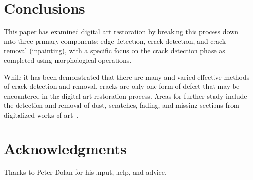 \documentclass{sig-alternate}
\begin{document}
\section{Conclusions}\label{conclusion}
This paper has examined digital art restoration by breaking this process down into three primary components: edge detection, crack detection, and crack removal (inpainting), with a specific focus on the crack detection phase as completed using morphological operations.

While it has been demonstrated that there are many and varied effective methods of crack detection and removal, cracks are only one form of defect that may be encountered in the digital art restoration process. Areas for further study include the detection and removal of dust, scratches, fading, and missing sections from digitalized works of art~\cite{TopHat:2010}.

\section{Acknowledgments}
Thanks to Peter Dolan for his input, help, and advice.


  
\end{document}
